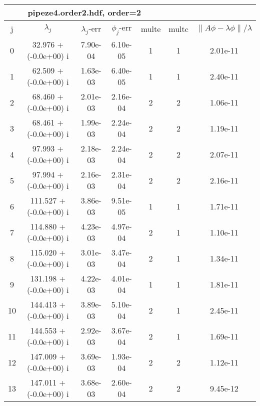 \begin{table}[H]\tableFont %
\begin{center}
\begin{tabular}{|c|c|c|c|c|c|c|}  \hline
\multicolumn{5}{|c|}{pipeze4.order2.hdf, order=2} \\ \hline
   j    &         $\lambda_j$        & $\lambda_j$-err  & $\phi_j$-err  & multe & multc & $\| A\phi - \lambda\phi\|/\lambda$     \\ \hline
     0  &     32.976 + (-0.0e+00) i  &    7.90e-04      &   6.10e-05    &   1    &  1   &    2.01e-11 \\
     1  &     62.509 + (-0.0e+00) i  &    1.63e-03      &   6.40e-05    &   1    &  1   &    2.40e-11 \\
     2  &     68.460 + (-0.0e+00) i  &    2.01e-03      &   2.16e-04    &   2    &  2   &    1.06e-11 \\
     3  &     68.461 + (-0.0e+00) i  &    1.99e-03      &   2.24e-04    &   2    &  2   &    1.19e-11 \\
     4  &     97.993 + (-0.0e+00) i  &    2.18e-03      &   2.24e-04    &   2    &  2   &    2.07e-11 \\
     5  &     97.994 + (-0.0e+00) i  &    2.16e-03      &   2.31e-04    &   2    &  2   &    2.16e-11 \\
     6  &    111.527 + (-0.0e+00) i  &    3.86e-03      &   9.51e-05    &   1    &  1   &    1.71e-11 \\
     7  &    114.880 + (-0.0e+00) i  &    4.23e-03      &   4.97e-04    &   2    &  1   &    1.10e-11 \\
     8  &    115.020 + (-0.0e+00) i  &    3.01e-03      &   3.47e-04    &   2    &  1   &    1.34e-11 \\
     9  &    131.198 + (-0.0e+00) i  &    4.22e-03      &   4.01e-04    &   1    &  1   &    1.81e-11 \\
    10  &    144.413 + (-0.0e+00) i  &    3.89e-03      &   5.10e-04    &   2    &  1   &    2.45e-11 \\
    11  &    144.553 + (-0.0e+00) i  &    2.92e-03      &   3.67e-04    &   2    &  1   &    1.69e-11 \\
    12  &    147.009 + (-0.0e+00) i  &    3.69e-03      &   1.93e-04    &   2    &  2   &    1.12e-11 \\
    13  &    147.011 + (-0.0e+00) i  &    3.68e-03      &   2.60e-04    &   2    &  2   &    9.45e-12 \\

\end{tabular}
\end{center}
\end{table}
